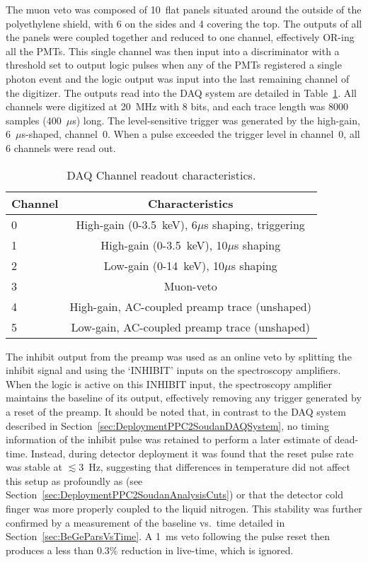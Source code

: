 The muon veto was composed of 10~flat panels situated around the outside of the polyethylene shield, with 6 on the sides and 4 covering the top.  The outputs of all the panels were coupled together and reduced to one channel, effectively OR-ing all the PMTs.  This single channel was then input into a discriminator with a threshold set to output logic pulses when any of the PMTs registered a single photon event and the logic output was input into the last remaining channel of the digitizer.  The outputs read into the DAQ system are detailed in Table~\ref{tab:SoudanDAQTable}.  All channels were digitized at 20~MHz with 8 bits, and each trace length was 8000 samples (400~$\mu$s) long.  The level-sensitive trigger was generated by the high-gain, 6~$\mu$s-shaped, channel~0.  When a pulse exceeded the trigger level in channel~0, all 6 channels were read out.  

	\begin{table}
		\centering
		\begin{tabular}{l c}
			\toprule
			Channel & Characteristics \\
			\midrule
			0 & High-gain (0-3.5~keV), 6$\mu$s shaping, triggering \\
			1 & High-gain (0-3.5~keV), 10$\mu$s shaping \\
			2 & Low-gain (0-14~keV), 10$\mu$s shaping \\
			3 & Muon-veto \\
			4 & High-gain, AC-coupled preamp trace (unshaped) \\
			5 & Low-gain, AC-coupled preamp trace (unshaped) \\
			\bottomrule
		\end{tabular}
		\caption[DAQ Channel readout characteristics]
		{DAQ Channel readout characteristics. }
		\label{tab:SoudanDAQTable}
	\end{table}

The inhibit output from the preamp was used as an online veto by splitting the inhibit signal and using the `INHIBIT' inputs on the spectroscopy amplifiers.  When the logic is active on this INHIBIT input, the spectroscopy amplifier maintains the baseline of its output, effectively removing any trigger generated by a reset of the preamp.  It should be noted that, in contrast to the DAQ system described in Section~\ref{sec:DeploymentPPC2SoudanDAQSystem}, no timing information of the inhibit pulse was retained to perform a later estimate of dead-time.  Instead, during detector deployment it was found that the reset pulse rate was stable at $\lesssim$3~Hz, suggesting that differences in temperature did not affect this setup as profoundly as  (see Section~\ref{sec:DeploymentPPC2SoudanAnalysisCuts}) or that the detector cold finger was more properly coupled to the liquid nitrogen.  This stability was further confirmed by a measurement of the baseline vs.~time detailed in Section~\ref{sec:BeGeParsVsTime}.
A 1~ms veto following the pulse reset then produces a less than 0.3\% reduction in live-time, which is ignored.  %

